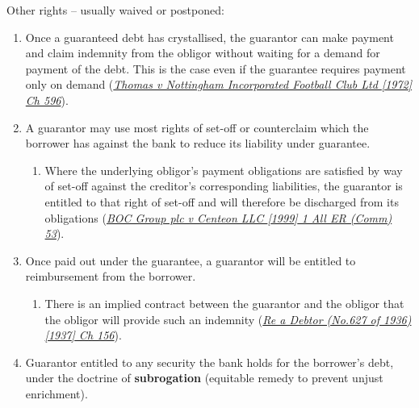\documentclass[
]{article}
\providecommand{\tightlist}{%
  \setlength{\itemsep}{0pt}\setlength{\parskip}{0pt}}
\begin{document}
Other rights -- usually waived or postponed:

\begin{enumerate}
\def\labelenumi{\arabic{enumi}.}
\tightlist
\item
  Once a guaranteed debt has crystallised, the guarantor can make
  payment and claim indemnity from the obligor without waiting for a
  demand for payment of the debt. This is the case even if the guarantee
  requires payment only on demand
  (\emph{\href{https://uk.westlaw.com/D-000-5038?originationContext=document\&transitionType=PLDocumentLink\&contextData=(sc.Default)\&ppcid=9fc18fbc2d79468f9bd5272f7e22e9db}{Thomas
  v Nottingham Incorporated Football Club Ltd {[}1972{]} Ch 596}}).
\item
  A guarantor may use most rights of set-off or counterclaim which the
  borrower has against the bank to reduce its liability under guarantee.

  \begin{enumerate}
  \def\labelenumii{\arabic{enumii}.}
  \tightlist
  \item
    Where the underlying obligor's payment obligations are satisfied by
    way of set-off against the creditor's corresponding liabilities, the
    guarantor is entitled to that right of set-off and will therefore be
    discharged from its obligations
    (\emph{\href{https://uk.westlaw.com/D-000-4199?originationContext=document\&transitionType=PLDocumentLink\&contextData=(sc.Default)\&ppcid=9fc18fbc2d79468f9bd5272f7e22e9db}{BOC
    Group plc v Centeon LLC {[}1999{]} 1 All ER (Comm) 53}}).
  \end{enumerate}
\item
  Once paid out under the guarantee, a guarantor will be entitled to
  reimbursement from the borrower.

  \begin{enumerate}
  \def\labelenumii{\arabic{enumii}.}
  \tightlist
  \item
    There is an implied contract between the guarantor and the obligor
    that the obligor will provide such an indemnity
    (\emph{\href{https://uk.westlaw.com/D-000-5037?originationContext=document\&transitionType=PLDocumentLink\&contextData=(sc.Default)\&ppcid=31b1b10b11a346b28acbfa5d800fec19}{Re
    a Debtor (No.627 of 1936) {[}1937{]} Ch 156}}).
  \end{enumerate}
\item
  Guarantor entitled to any security the bank holds for the borrower's
  debt, under the doctrine of \textbf{subrogation} (equitable remedy to
  prevent unjust enrichment).


\end{enumerate}
\end{document}
